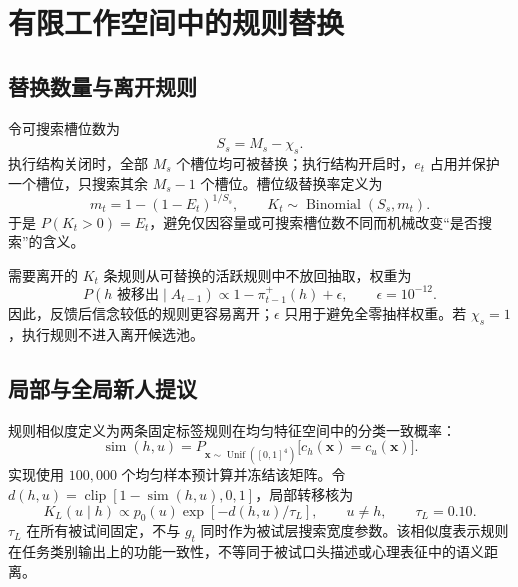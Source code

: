 \documentclass[12pt]{article}
\begin{document}
\section{有限工作空间中的规则替换}

\subsection{替换数量与离开规则}

令可搜索槽位数为
\begin{equation}
S_s=M_s-\chi_s.
\label{eq:searchable-slots}
\end{equation}
执行结构关闭时，全部 $M_s$ 个槽位均可被替换；执行结构开启时，$e_t$ 占用并保护一个槽位，只搜索其余 $M_s-1$ 个槽位。槽位级替换率定义为
\begin{equation}
m_t=1-(1-E_t)^{1/S_s},
\qquad
K_t\sim\operatorname{Binomial}(S_s,m_t).
\label{eq:replacement-count}
\end{equation}
于是 $P(K_t>0)=E_t$，避免仅因容量或可搜索槽位数不同而机械改变“是否搜索”的含义。

需要离开的 $K_t$ 条规则从可替换的活跃规则中不放回抽取，权重为
\begin{equation}
P(h\text{ 被移出}\mid A_{t-1})
\propto
1-\pi_{t-1}^{+}(h)+\epsilon,
\qquad
\epsilon=10^{-12}.
\label{eq:drop-probability}
\end{equation}
因此，反馈后信念较低的规则更容易离开；$\epsilon$ 只用于避免全零抽样权重。若 $\chi_s=1$，执行规则不进入离开候选池。

\subsection{局部与全局新人提议}

规则相似度定义为两条固定标签规则在均匀特征空间中的分类一致概率：
\begin{equation}
\operatorname{sim}(h,u)
=P_{\bm x\sim\operatorname{Unif}([0,1]^4)}
\bigl[c_h(\bm x)=c_u(\bm x)\bigr].
\label{eq:functional-similarity}
\end{equation}
实现使用 $100{,}000$ 个均匀样本预计算并冻结该矩阵。令
$d(h,u)=\operatorname{clip}[1-\operatorname{sim}(h,u),0,1]$，局部转移核为
\begin{equation}
K_L(u\mid h)
\propto
p_0(u)\exp[-d(h,u)/\tau_L],
\qquad
u\neq h,
\qquad
\tau_L=0.10.
\label{eq:local-kernel}
\end{equation}
$\tau_L$ 在所有被试间固定，不与 $g_t$ 同时作为被试层搜索宽度参数。该相似度表示规则在任务类别输出上的功能一致性，不等同于被试口头描述或心理表征中的语义距离。
\end{document}
